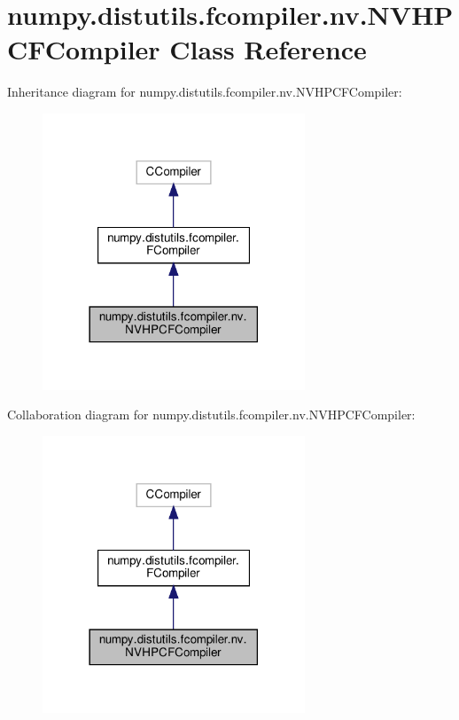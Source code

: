 \hypertarget{classnumpy_1_1distutils_1_1fcompiler_1_1nv_1_1NVHPCFCompiler}{}\section{numpy.\+distutils.\+fcompiler.\+nv.\+N\+V\+H\+P\+C\+F\+Compiler Class Reference}
\label{classnumpy_1_1distutils_1_1fcompiler_1_1nv_1_1NVHPCFCompiler}


Inheritance diagram for numpy.\+distutils.\+fcompiler.\+nv.\+N\+V\+H\+P\+C\+F\+Compiler\+:
\nopagebreak
\begin{figure}[H]
\begin{center}
\leavevmode
\includegraphics[width=222pt]{classnumpy_1_1distutils_1_1fcompiler_1_1nv_1_1NVHPCFCompiler__inherit__graph}
\end{center}
\end{figure}


Collaboration diagram for numpy.\+distutils.\+fcompiler.\+nv.\+N\+V\+H\+P\+C\+F\+Compiler\+:
\nopagebreak
\begin{figure}[H]
\begin{center}
\leavevmode
\includegraphics[width=222pt]{classnumpy_1_1distutils_1_1fcompiler_1_1nv_1_1NVHPCFCompiler__coll__graph}
\end{center}
\end{figure}
